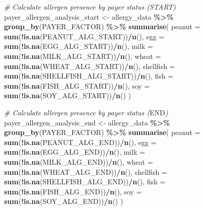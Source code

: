 \documentclass[
]{article}
\newenvironment{Shaded}{\begin{snugshade}}{\end{snugshade}}
\newcommand{\AttributeTok}[1]{\textcolor[rgb]{0.13,0.29,0.53}{#1}}
\newcommand{\CommentTok}[1]{\textcolor[rgb]{0.56,0.35,0.01}{\textit{#1}}}
\newcommand{\FunctionTok}[1]{\textcolor[rgb]{0.13,0.29,0.53}{\textbf{#1}}}
\newcommand{\NormalTok}[1]{#1}
\newcommand{\OtherTok}[1]{\textcolor[rgb]{0.56,0.35,0.01}{#1}}
\newcommand{\RegionMarkerTok}[1]{#1}
\newcommand{\SpecialCharTok}[1]{\textcolor[rgb]{0.81,0.36,0.00}{\textbf{#1}}}
\begin{document}
\begin{Shaded}
\begin{Highlighting}[]
\CommentTok{\# Calculate allergen presence by payer status (START)}
\NormalTok{payer\_allergen\_analysis\_start }\OtherTok{\textless{}{-}}\NormalTok{ allergy\_data }\SpecialCharTok{\%\textgreater{}\%}
  \FunctionTok{group\_by}\NormalTok{(PAYER\_FACTOR) }\SpecialCharTok{\%\textgreater{}\%}
  \FunctionTok{summarise}\NormalTok{(}
    \AttributeTok{peanut =} \FunctionTok{sum}\NormalTok{(}\SpecialCharTok{!}\FunctionTok{is.na}\NormalTok{(PEANUT\_ALG\_START))}\SpecialCharTok{/}\FunctionTok{n}\NormalTok{(),}
    \AttributeTok{egg =} \FunctionTok{sum}\NormalTok{(}\SpecialCharTok{!}\FunctionTok{is.na}\NormalTok{(EGG\_ALG\_START))}\SpecialCharTok{/}\FunctionTok{n}\NormalTok{(),}
    \AttributeTok{milk =} \FunctionTok{sum}\NormalTok{(}\SpecialCharTok{!}\FunctionTok{is.na}\NormalTok{(MILK\_ALG\_START))}\SpecialCharTok{/}\FunctionTok{n}\NormalTok{(),}
    \AttributeTok{wheat =} \FunctionTok{sum}\NormalTok{(}\SpecialCharTok{!}\FunctionTok{is.na}\NormalTok{(WHEAT\_ALG\_START))}\SpecialCharTok{/}\FunctionTok{n}\NormalTok{(),}
    \AttributeTok{shellfish =} \FunctionTok{sum}\NormalTok{(}\SpecialCharTok{!}\FunctionTok{is.na}\NormalTok{(SHELLFISH\_ALG\_START))}\SpecialCharTok{/}\FunctionTok{n}\NormalTok{(),}
    \AttributeTok{fish =} \FunctionTok{sum}\NormalTok{(}\SpecialCharTok{!}\FunctionTok{is.na}\NormalTok{(FISH\_ALG\_START))}\SpecialCharTok{/}\FunctionTok{n}\NormalTok{(),}
    \AttributeTok{soy =} \FunctionTok{sum}\NormalTok{(}\SpecialCharTok{!}\FunctionTok{is.na}\NormalTok{(SOY\_ALG\_START))}\SpecialCharTok{/}\FunctionTok{n}\NormalTok{()}
\NormalTok{  )}

\CommentTok{\# Calculate allergen presence by payer status (}\RegionMarkerTok{END}\CommentTok{)}
\NormalTok{payer\_allergen\_analysis\_end }\OtherTok{\textless{}{-}}\NormalTok{ allergy\_data }\SpecialCharTok{\%\textgreater{}\%}
  \FunctionTok{group\_by}\NormalTok{(PAYER\_FACTOR) }\SpecialCharTok{\%\textgreater{}\%}
  \FunctionTok{summarise}\NormalTok{(}
    \AttributeTok{peanut =} \FunctionTok{sum}\NormalTok{(}\SpecialCharTok{!}\FunctionTok{is.na}\NormalTok{(PEANUT\_ALG\_END))}\SpecialCharTok{/}\FunctionTok{n}\NormalTok{(),}
    \AttributeTok{egg =} \FunctionTok{sum}\NormalTok{(}\SpecialCharTok{!}\FunctionTok{is.na}\NormalTok{(EGG\_ALG\_END))}\SpecialCharTok{/}\FunctionTok{n}\NormalTok{(),}
    \AttributeTok{milk =} \FunctionTok{sum}\NormalTok{(}\SpecialCharTok{!}\FunctionTok{is.na}\NormalTok{(MILK\_ALG\_END))}\SpecialCharTok{/}\FunctionTok{n}\NormalTok{(),}
    \AttributeTok{wheat =} \FunctionTok{sum}\NormalTok{(}\SpecialCharTok{!}\FunctionTok{is.na}\NormalTok{(WHEAT\_ALG\_END))}\SpecialCharTok{/}\FunctionTok{n}\NormalTok{(),}
    \AttributeTok{shellfish =} \FunctionTok{sum}\NormalTok{(}\SpecialCharTok{!}\FunctionTok{is.na}\NormalTok{(SHELLFISH\_ALG\_END))}\SpecialCharTok{/}\FunctionTok{n}\NormalTok{(),}
    \AttributeTok{fish =} \FunctionTok{sum}\NormalTok{(}\SpecialCharTok{!}\FunctionTok{is.na}\NormalTok{(FISH\_ALG\_END))}\SpecialCharTok{/}\FunctionTok{n}\NormalTok{(),}
    \AttributeTok{soy =} \FunctionTok{sum}\NormalTok{(}\SpecialCharTok{!}\FunctionTok{is.na}\NormalTok{(SOY\_ALG\_END))}\SpecialCharTok{/}\FunctionTok{n}\NormalTok{()}
\NormalTok{  )}


\end{Highlighting}
\end{Shaded}
\end{document}
